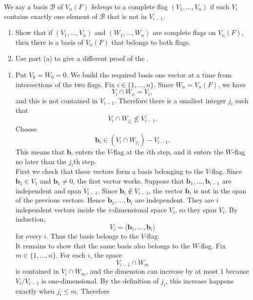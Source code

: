 \documentclass[../Odyssey_Project.tex]{subfiles}
\begin{document}
\begin{exercise}
\label{ex:5.2}
We say a basis $\mathcal{B}$ of $V_n(F)$ \emph{belongs} to a complete flag $(V_1, \dots, V_n)$ if each $V_i$ contains exactly one element of $\mathcal{B}$ that is not in $V_{i-1}$.
\begin{enumerate}
    \item[(a)] Show that if $(V_1, \dots, V_n)$ and $(W_1, \dots, W_n)$ are complete flags on $V_n(F)$, then there is a basis of $V_n(F)$ that belongs to both flags.
    \item[(b)] Use part (a) to give a different proof of the .
\end{enumerate}
\end{exercise}
\begin{solution}
    \phantom{}\par
    \begin{enumerate}
        \item[(a)] Put $V_0=W_0=0$. We build the required basis one vector at a time from intersections of the two flags. Fix $i\in\{1,\dots,n\}$. Since $W_n=V_n(F)$, we have
    \[
        V_i\cap W_n=V_i,
    \]
    and this is not contained in $V_{i-1}$. Therefore there is a smallest integer $j_i$ such that
    \[
        V_i\cap W_{j_i}\not\leq V_{i-1}.
    \]
    Choose
    \[
        \mathbf{b}_i\in (V_i\cap W_{j_i})-V_{i-1}.
    \]
    This means that $\mathbf{b}_i$ enters the $V$-flag at the $i$th step, and it enters the $W$-flag no later than the $j_i$th step.\\
    First we check that these vectors form a basis belonging to the $V$-flag. Since $\mathbf{b}_1\in V_1$ and $\mathbf{b}_1\neq0$, the first vector works. Suppose that $\mathbf{b}_1,\dots,\mathbf{b}_{i-1}$ are independent and span $V_{i-1}$. Since $\mathbf{b}_i\notin V_{i-1}$, the vector $\mathbf{b}_i$ is not in the span of the previous vectors. Hence $\mathbf{b}_1,\dots,\mathbf{b}_i$ are independent. They are $i$ independent vectors inside the $i$-dimensional space $V_i$, so they span $V_i$. By induction,
    \[
        V_i=\langle \mathbf{b}_1,\dots,\mathbf{b}_i\rangle
    \]
    for every $i$. Thus the basis belongs to the $V$-flag.\\
    It remains to show that the same basis also belongs to the $W$-flag. Fix $m\in\{1,\dots,n\}$. For each $i$, the space
    \[
        V_{i-1}\cap W_m
    \]
    is contained in $V_i\cap W_m$, and the dimension can increase by at most $1$ because $V_i/V_{i-1}$ is one-dimensional. By the definition of $j_i$, this increase happens exactly when $j_i\leq m$. Therefore

\end{enumerate}
\end{solution}
\end{document}
